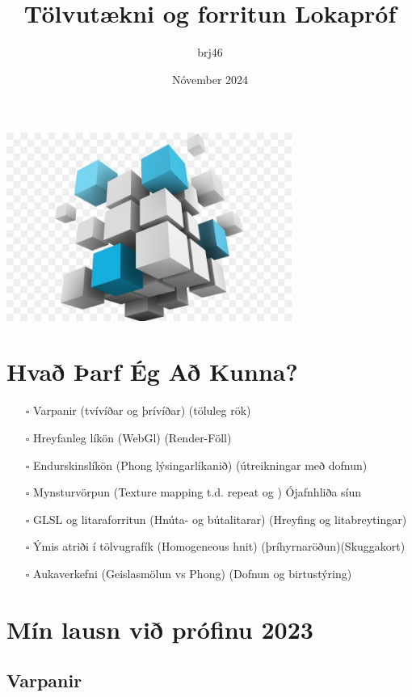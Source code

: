 \documentclass{article}
\title{Tölvutækni og forritun Lokapróf}
\author{brj46 }
\date{Nóvember 2024}
\begin{document}
\maketitle

\vspace {7em}
\begin{center}
\includegraphics[width=0.7\textwidth]{3d.jpg}
\end{center}

\newpage
\section*{Hvað Þarf Ég Að Kunna?}

\begin{itemize}
    \item[$\square$] Varpanir (tvívíðar og þrívíðar) (töluleg rök)
    \item[$\square$] Hreyfanleg líkön (WebGl) (Render-Föll)
    \item[$\square$] Endurskinslíkön (Phong lýsingarlíkanið) (útreikningar með dofnun)
    \item[$\square$] Mynsturvörpun (Texture mapping t.d. repeat og ) Ójafnhliða síun
    \item[$\square$] GLSL og litaraforritun (Hnúta- og bútalitarar) (Hreyfing og litabreytingar)
    \item[$\square$] Ýmis atriði í tölvugrafík (Homogeneous hnit) (þríhyrnaröðun)(Skuggakort)
    \item[$\square$] Aukaverkefni (Geislasmölun vs Phong) (Dofnun og birtustýring)
\end{itemize}

\newpage

\section{Mín lausn við prófinu 2023}

\subsection{Varpanir}
\end{document}
